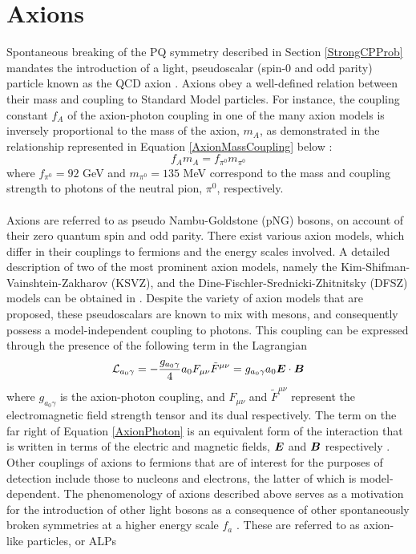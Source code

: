 \section{Axions}
Spontaneous breaking of the PQ symmetry described in Section \ref{StrongCPProb} mandates the introduction of a light, pseudoscalar (spin-0 and odd parity) particle known as the QCD axion \cite{article}. Axions obey a well-defined relation between their mass and coupling
to Standard Model particles. For instance, the coupling constant $f_{A}$ of the axion-photon coupling in one of the many axion models is inversely proportional to the mass of the axion, $m_{A}$, as demonstrated in the relationship represented in Equation \ref{AxionMassCoupling} below \cite{Michael:920}:
\begin{equation}\label{AxionMassCoupling}
    f_{A}m_{A} = f_{\pi^{0}}m_{\pi^{0}}
\end{equation}
where $f_{\pi^{0}} = 92$ GeV and $m_{\pi^{0}} = 135$ MeV correspond to the mass and coupling strength to photons of the neutral pion, $\pi^{0}$, respectively.\\
\\
Axions are referred to as pseudo Nambu-Goldstone (pNG) bosons, on account of their zero quantum spin and odd parity. There exist various axion models, which differ in their couplings to fermions and the energy scales involved. A detailed description of two of the most prominent axion models, namely the Kim-Shifman-Vainshtein-Zakharov (KSVZ), and the Dine-Fischler-Srednicki-Zhitnitsky (DFSZ) models can be obtained in \cite{Garcia_Irastorza_2022}.
Despite the variety of axion models that are proposed, these pseudoscalars are known to mix with mesons, and consequently possess a model-independent coupling to photons. This coupling can be expressed through the presence of the following term in the Lagrangian \cite{Garcia_Irastorza_2022}
\begin{equation}\label{AxionPhoton}
    \mathcal{L}_{a_{0}\gamma} = -\frac{g_{a_{0}\gamma}}{4}a_{0}F_{\mu\nu}\tilde{F}^{\mu\nu} = g_{a_{0}\gamma}a_{0}\vb*{E}\cdot\vb*{B}
\end{equation}
where $g_{a_{0}\gamma}$ is the axion-photon coupling, and $F_{\mu\nu}$ and $\tilde{F}^{\mu\nu}$ represent the electromagnetic field strength tensor and its dual respectively. The term on the far right of Equation \ref{AxionPhoton} is an equivalent form of the interaction that is written in terms of the electric and magnetic fields, $\vb*{E}$ and $\vb*{B}$ respectively \cite{Garcia_Irastorza_2022}. Other couplings of axions
to fermions that are of interest for the purposes of detection include those to nucleons and electrons, the latter of which is model-dependent. The phenomenology of axions described above serves as a motivation for the introduction of other light bosons as a consequence of other spontaneously broken symmetries at a higher energy scale $f_{a}$ \cite{Ringwald:2012hr}. These are referred to as axion-like particles, or ALPs
